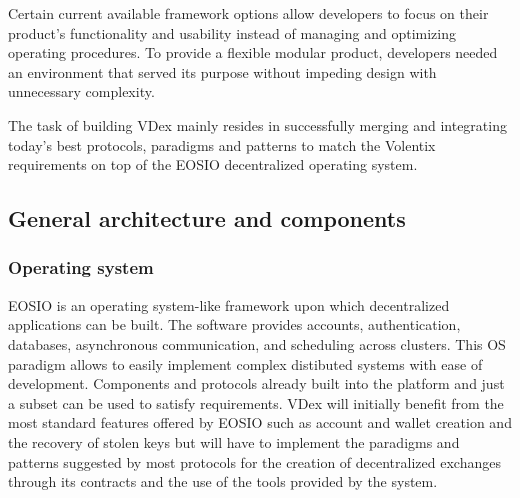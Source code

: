 \documentclass[]{article}
\begin{document}
	Certain current available framework options allow developers to focus on their product's functionality and usability instead of managing and optimizing operating procedures. To provide a flexible modular product, developers needed an environment that served its purpose without impeding design with unnecessary complexity. 
	
	The task of building VDex mainly resides in successfully merging
	and integrating today's best protocols, paradigms and patterns to match the 
	Volentix requirements on top of the EOSIO decentralized operating system.
	

\subsection{General architecture and components}
	
	\subsubsection{Operating system}
	EOSIO is an operating system-like framework upon which decentralized applications can be built. The software provides accounts, authentication, databases, asynchronous communication, and scheduling across clusters. 
	This OS paradigm allows to easily implement complex distibuted systems with ease of development.
	Components and protocols already built into the platform and just a subset can be used to satisfy requirements.
	VDex will initially benefit from the most standard features offered by EOSIO such as account and wallet creation and the recovery of stolen keys but will have to implement the paradigms and patterns suggested by most protocols for the creation of decentralized exchanges through its contracts and the use of the tools provided by the system.\\

	
\end{document}
